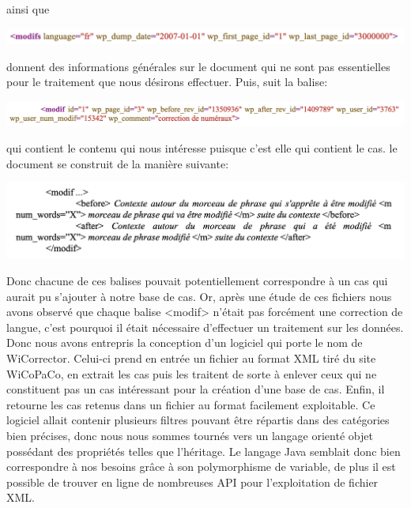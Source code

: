 \documentclass[11pt]{article}
\begin{document}
ainsi que 

\begin{center}
\includegraphics[width=14cm]{exemple6.png} %
\end{center}

donnent des informations g\'{e}n\'{e}rales sur le document qui ne sont pas essentielles pour le traitement que nous d\'{e}sirons effectuer. 
Puis, suit la balise:
\begin{center}
\includegraphics[width=14cm]{exemple7.png} %
\end{center}

qui contient le contenu qui nous int\'{e}resse puisque c'est elle qui contient le cas. le document se construit de la mani\`{e}re suivante:
\begin{center}
\includegraphics[width=14cm]{exemple8.png} %
\end{center}

Donc chacune de ces balises pouvait potentiellement correspondre \`{a} un cas qui aurait pu s'ajouter \`{a} notre base de cas. Or, apr\`{e}s une \'{e}tude de ces fichiers nous avons observ\'{e} que chaque balise <modif> n'\'{e}tait pas forc\'{e}ment une correction de langue, c'est pourquoi il \'{e}tait n\'{e}cessaire d'effectuer un traitement sur les donn\'{e}es.
\newline
\newline
Donc nous avons entrepris la conception d'un logiciel qui porte le nom de WiCorrector. Celui-ci prend en entr\'{e}e un fichier au format XML tir\'{e} du site WiCoPaCo, en extrait les cas puis les traitent de sorte \`{a} enlever ceux qui ne constituent pas un cas int\'{e}ressant pour la cr\'{e}ation d'une base de cas. Enfin, il retourne les cas retenus dans un fichier au format facilement exploitable.
\newline
\newline
Ce logiciel allait contenir plusieurs filtres pouvant \^{e}tre r\'{e}partis dans des cat\'{e}gories bien pr\'{e}cises, donc nous nous sommes tourn\'{e}s vers un langage orient\'{e} objet poss\'{e}dant des propri\'{e}t\'{e}s telles que l'h\'{e}ritage. Le langage Java semblait donc bien correspondre \`{a} nos besoins gr\^{a}ce \`{a} son polymorphisme de variable, de plus il est possible de trouver en ligne de nombreuses API pour l'exploitation de fichier XML.
\newline
\newline
\end{document}

